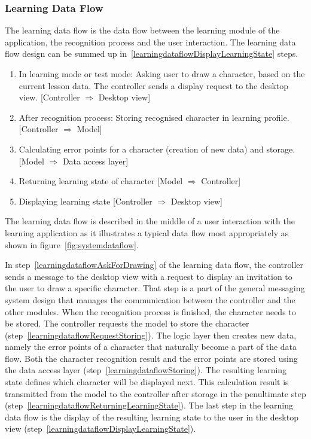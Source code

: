 \subsubsection{Learning Data Flow}
\label{sec:arch:learningdataflow}

The learning data flow is the data flow between the learning module of the 
application, the recognition process and the user interaction.
The learning data flow design can be summed up 
in~\ref{learningdataflowDisplayLearningState} steps.
\begin{enumerate}
  \item \label{learningdataflowAskForDrawing} 
        In learning mode or test mode: Asking user to draw a character,
        based on the current lesson data. The controller sends a display
        request to the desktop view.
        [Controller $\Rightarrow$ Desktop view]
  \item \label{learningdataflowRequestStoring} 
        After recognition process: Storing recognised character in 
        learning profile.
        [Controller $\Rightarrow$ Model]
  \item \label{learningdataflowStoring} 
        Calculating error points for a character (creation of new data) and
        storage.
        [Model $\Rightarrow$ Data access layer]
  \item \label{learningdataflowReturningLearningState} 
        Returning learning state of character 
        [Model $\Rightarrow$ Controller] 
  \item \label{learningdataflowDisplayLearningState} %
        Displaying learning state 
        [Controller $\Rightarrow$ Desktop view]
\end{enumerate}
The learning data flow is described in the middle of a user interaction with the
learning application as it illustrates a typical data flow most appropriately
as shown in figure~\ref{fig:systemdataflow}.

In step~\ref{learningdataflowAskForDrawing} of the learning data flow, the 
controller sends a message to the desktop view with a request to display an 
invitation to the user to draw a specific character.
That step is a part of the general messaging system design that manages the 
communication between the controller and the other modules.
When the recognition process is finished, the character needs to be stored.
The controller requests the model to store the 
character (step~\ref{learningdataflowRequestStoring}).
The logic layer then creates new data, namely the error points of a 
character that naturally become a part of the data flow.
Both the character recognition result and the error points are stored
using the data access layer (step~\ref{learningdataflowStoring}). 
The resulting learning state defines which character will be displayed next.
This calculation result is transmitted from the model to the 
controller after storage in the penultimate 
step (step~\ref{learningdataflowReturningLearningState}).
The last step in the learning data flow is the display of the resulting 
learning state to the user in the desktop 
view (step~\ref{learningdataflowDisplayLearningState}).

